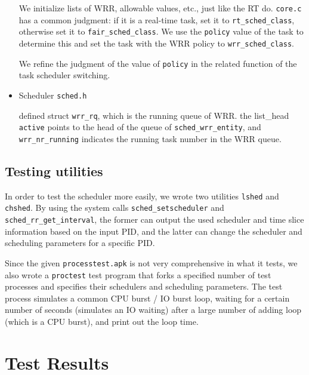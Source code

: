 \documentclass[11pt]{article}
\begin{document}
\begin{itemize}
  We initialize lists of WRR, allowable values, etc., just like the RT
  do. \texttt{core.c} has a common judgment: if it is a real-time task,
  set it to \texttt{rt\_sched\_class}, otherwise set it to
  \texttt{fair\_sched\_class}. We use the \texttt{policy} value of the
  task to determine this and set the task with the WRR policy to
  \texttt{wrr\_sched\_class}.

  We refine the judgment of the value of \texttt{policy} in the related
  function of the task scheduler switching.
\item
  Scheduler \texttt{sched.h}

  defined struct \texttt{wrr\_rq}, which is the running queue of WRR.
  the list\_head \texttt{active} points to the head of the queue of
  \texttt{sched\_wrr\_entity}, and \texttt{wrr\_nr\_running} indicates
  the running task number in the WRR queue.
\end{itemize}

\subsection{Testing utilities}\label{testing-utilities}

In order to test the scheduler more easily, we wrote two utilities
\texttt{lshed} and \texttt{chshed}. By using the system calls
\texttt{sched\_setscheduler} and \texttt{sched\_rr\_get\_interval}, the
former can output the used scheduler and time slice information based on
the input PID, and the latter can change the scheduler and scheduling
parameters for a specific PID.

Since the given \texttt{processtest.apk} is not very comprehensive in
what it tests, we also wrote a \texttt{proctest} test program that forks
a specified number of test processes and specifies their schedulers and
scheduling parameters. The test process simulates a common CPU burst /
IO burst loop, waiting for a certain number of seconds (simulates an IO
waiting) after a large number of adding loop (which is a CPU burst), and
print out the loop time.

\section{Test Results}\label{test-results}
\end{document}
